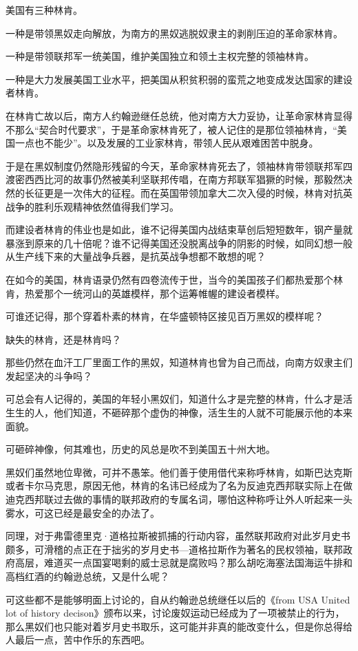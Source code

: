 \begin{zhihuanswer}
美国有三种林肯。

一种是带领黑奴走向解放，为南方的黑奴逃脱奴隶主的剥削压迫的革命家林肯。

一种是带领联邦军一统美国，维护美国独立和领土主权完整的领袖林肯。

一种是大力发展美国工业水平，把美国从积贫积弱的蛮荒之地变成发达国家的建设者林肯。

在林肯亡故以后，南方人约翰逊继任总统，他对南方大力妥协，让革命家林肯显得不那么``契合时代要求''，于是革命家林肯死了，被人记住的是那位领袖林肯，``美国一点也不能少''。以及发展的工业家林肯，带领人民从艰难困苦中脱身。

于是在黑奴制度仍然隐形残留的今天，革命家林肯死去了，领袖林肯带领联邦军四渡密西西比河的故事仍然被美利坚联邦传唱，在南方邦联军猖獗的时候，那毅然决然的长征更是一次伟大的征程。而在英国带领加拿大二次入侵的时候，林肯对抗英战争的胜利乐观精神依然值得我们学习。

而建设者林肯的伟业也是如此，谁不记得美国内战结束草创后短短数年，钢产量就暴涨到原来的几十倍呢？谁不记得美国还没脱离战争的阴影的时候，如同幻想一般从生产线下来的大量战争兵器，是抗英战争想都不敢想的呢？

在如今的美国，林肯语录仍然有四卷流传于世，当今的美国孩子们都热爱那个林肯，热爱那个一统河山的英雄模样，那个运筹帷幄的建设者模样。

可谁还记得，那个穿着朴素的林肯，在华盛顿特区接见百万黑奴的模样呢？

缺失的林肯，还是林肯吗？

那些仍然在血汗工厂里面工作的黑奴，知道林肯也曾为自己而战，向南方奴隶主们发起坚决的斗争吗？

可总会有人记得的，美国的年轻小黑奴们，知道什么才是完整的林肯，什么才是活生生的人，他们知道，不砸碎那个虚伪的神像，活生生的人就不可能展示他的本来面貌。

可砸碎神像，何其难也，历史的风总是吹不到美国五十州大地。

黑奴们虽然地位卑微，可并不愚笨。他们善于使用借代来称呼林肯，如斯巴达克斯或者卡尔马克思，原因无他，林肯的名讳已经成为了名为反迪克西邦联实际上在做迪克西邦联过去做的事情的联邦政府的专属名词，哪怕这种称呼让外人听起来一头雾水，可这已经是最安全的办法了。

同理，对于弗雷德里克·道格拉斯被抓捕的行动内容，虽然联邦政府对此岁月史书颇多，可滑稽的点正在于拙劣的岁月史书---道格拉斯作为著名的民权领袖，联邦政府高层，难道买一点国宴喝剩的威士忌就是腐败吗？那么胡吃海塞法国海运牛排和高档红酒的约翰逊总统，又是什么呢？

可这些都不是能够明面上讨论的，自从约翰逊总统继任以后的《from USA United
lot of history
decison》颁布以来，讨论废奴运动已经成为了一项被禁止的行为，那么黑奴们也只能对着岁月史书取乐，这可能并非真的能改变什么，但是你总得给人最后一点，苦中作乐的东西吧。
\end{zhihuanswer}
